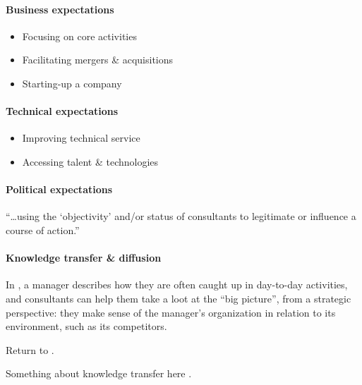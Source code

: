 \documentclass[12pt]{article}
\providecommand{\tightlist}{%
  \setlength{\itemsep}{0pt}\setlength{\parskip}{0pt}}
\begin{document}
\hypertarget{business-expectations}{%
\paragraph{Business expectations}\label{business-expectations}}

\begin{itemize}
\tightlist
\item
  Focusing on core activities
\item
  Facilitating mergers \& acquisitions
\item
  Starting-up a company
\end{itemize}

\hypertarget{technical-expectations}{%
\paragraph{Technical expectations}\label{technical-expectations}}

\begin{itemize}
\tightlist
\item
  Improving technical service
\item
  Accessing talent \& technologies
\end{itemize}

\hypertarget{political-expectations}{%
\paragraph{Political expectations}\label{political-expectations}}

``\ldots using the `objectivity' and/or status of consultants to
legitimate or influence a course of action.'' \citep[ 233]{sturdy1998}

\hypertarget{knowledge-transfer-diffusion}{%
\paragraph{Knowledge transfer \&
diffusion}\label{knowledge-transfer-diffusion}}

In \citet[53]{werr2002}, a manager describes how they are often caught
up in day-to-day activities, and consultants can help them take a loot
at the ``big picture'', from a strategic perspective: they make sense of
the manager's organization in relation to its environment, such as its
competitors.

Return to \citet{turner1982}.

Something about knowledge transfer here \citep{sturdy2009}.
\end{document}
